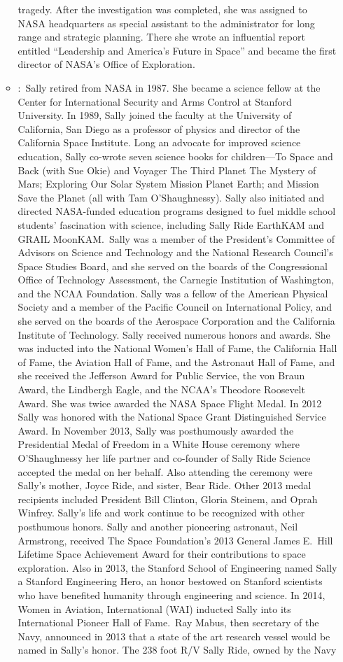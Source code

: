 \documentclass[12pt,a4paper]{article}
\begin{document}
\begin{enumerate}
\begin{itemize}
tragedy. After the investigation was completed, she was assigned to NASA headquarters as special assistant to the administrator for long range and strategic planning. There she wrote an influential report entitled ``Leadership and America's Future in Space'' and became the first director of NASA's Office of Exploration.
      \item {}:\ Sally retired from NASA in 1987. She became a science fellow at the Center for International Security and Arms Control at Stanford University. In 1989, Sally joined the faculty at the University of California, San Diego as a professor of physics and director of the California Space Institute. Long an advocate for improved science education, Sally co-wrote seven science books for children—To Space and Back (with Sue Okie) and Voyager The Third Planet The Mystery of Mars; Exploring Our Solar System Mission Planet Earth; and Mission Save the Planet (all with Tam O’Shaughnessy). Sally also initiated and directed NASA-funded education programs designed to fuel middle school students’ fascination with science, including Sally Ride EarthKAM and GRAIL MoonKAM.\ Sally was a member of the President's Committee of Advisors on Science and Technology and the National Research Council's Space Studies Board, and she served on the boards of the Congressional Office of Technology Assessment, the Carnegie Institution of Washington, and the NCAA Foundation. Sally was a fellow of the American Physical Society and a member of the Pacific Council on International Policy, and she served on the boards of the Aerospace Corporation and the California Institute of Technology. Sally received numerous honors and awards. She was inducted into the National Women's Hall of Fame, the California Hall of Fame, the Aviation Hall of Fame, and the Astronaut Hall of Fame, and she received the Jefferson Award for Public Service, the von Braun Award, the Lindbergh Eagle, and the NCAA's Theodore Roosevelt Award. She was twice awarded the NASA Space Flight Medal. In 2012 Sally was honored with the National Space Grant Distinguished Service Award. In November 2013, Sally was posthumously awarded the Presidential Medal of Freedom in a White House ceremony where O'Shaughnessy her life partner and co-founder of Sally Ride Science accepted the medal on her behalf. Also attending the ceremony were Sally's mother, Joyce Ride, and sister, Bear Ride. Other 2013 medal recipients included President Bill Clinton, Gloria Steinem, and Oprah Winfrey. Sally's life and work continue to be recognized with other posthumous honors. Sally and another pioneering astronaut, Neil Armstrong, received The Space Foundation's 2013 General James E.\ Hill Lifetime Space Achievement Award for their contributions to space exploration. Also in 2013, the Stanford School of Engineering named Sally a Stanford Engineering Hero, an honor bestowed on Stanford scientists who have benefited humanity through engineering and science. In 2014, Women in Aviation, International (WAI) inducted Sally into its International Pioneer Hall of Fame.\ Ray Mabus, then secretary of the Navy, announced in 2013 that a state of the art research vessel would be named in Sally's honor. The 238 foot R/V Sally Ride, owned by the Navy 
\end{itemize}
\end{enumerate}
\end{document}
